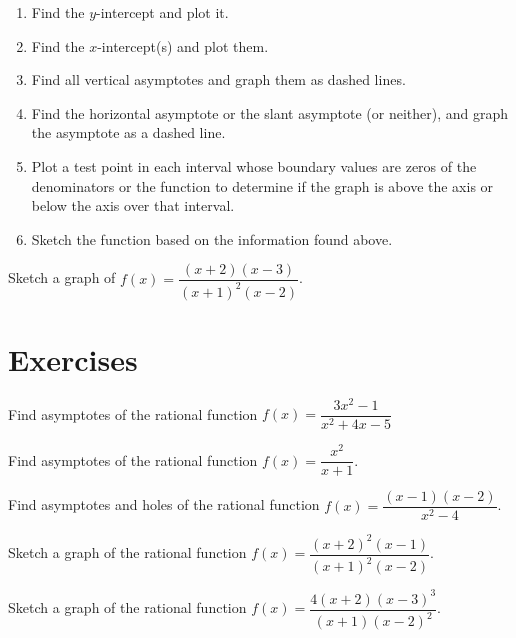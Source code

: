 \begin{howto}
  \begin{enumerate}
  \item Find the $y$-intercept and plot it.
  \item Find the $x$-intercept(s) and plot them.
  \item Find all vertical asymptotes and graph them as dashed lines.
  \item Find the horizontal asymptote or the slant asymptote (or neither), and graph the asymptote as a dashed line.
  \item Plot a test point in each interval whose boundary values are zeros of the denominators or the function to determine if the graph is above the axis or below the axis over that interval.
  \item Sketch the function based on the information found above.
  \end{enumerate}
\end{howto}

\begin{example}
  Sketch a graph of  $f(x)=\dfrac{(x+2)(x-3)}{(x+1)^2(x-2)}$.
\end{example}

\newpage

\section*{Exercises}

\begin{example}
  Find asymptotes of the rational function $f(x)=\dfrac{3x^2-1}{x^2+4x-5}$
\end{example}

\begin{exercise}
  Find asymptotes of the rational function $f(x)=\dfrac{x^{2}}{x + 1}$.
\end{exercise}

\begin{exercise}
  Find asymptotes and holes of the rational function $f(x)=\dfrac{(x-1)(x-2)}{x^2-4}$.
\end{exercise}
\newpage

\begin{exercise}
  Sketch a graph of the rational function $f(x)=\dfrac{(x+2)^2(x-1)}{(x+1)^2(x-2)}$.
\end{exercise}

\begin{exercise}
  Sketch a graph of the rational function  $f(x)=\dfrac{4(x+2)(x-3)^3}{(x+1)(x-2)^2}$.
\end{exercise}

